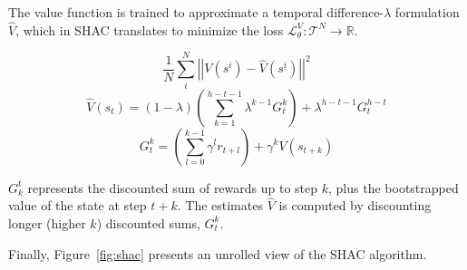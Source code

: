 The value function is trained to approximate a temporal difference-$\lambda$ formulation \cite{Sutton98} $\hat{V}$, which in SHAC translates to minimize the loss $\mathcal{L}_\theta^{V}:\mathcal{T}^N\rightarrow\mathbb{R}$.

$$ \frac{1}{N}\sum_i^N\left|\left| V(s^i) - \hat{V}(s^i) \right|\right|^2 $$
$$ \hat{V}(s_t) = (1-\lambda) \left(\sum_{k=1}^{h-t-1}\lambda^{k-1}G_t^k\right) + \lambda^{h-t-1}G_t^{h-t}$$
$$ G_t^k = \left(\sum_{l=0}^{k-1}\gamma^l r_{t+l}\right) + \gamma^k V(s_{t+k})$$

$G^t_k$ represents the discounted sum of rewards up to step $k$, plus the bootstrapped value of the state at step $t+k$. The estimates $\hat{V}$ is computed by discounting longer (higher $k$) discounted sums, $G^k_t$.

Finally, Figure~\ref{fig:shac} presents an unrolled view of the SHAC algorithm.
